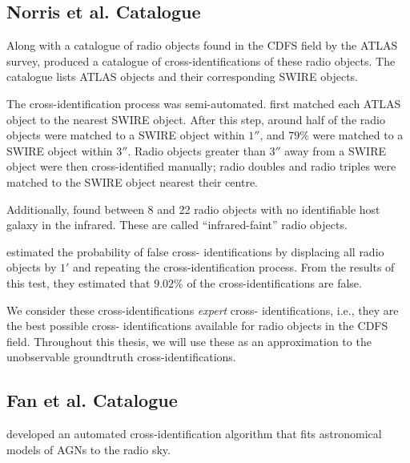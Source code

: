         \subsection{Norris et al. Catalogue}
        \label{sec:norris}

            Along with a catalogue of radio objects found in the CDFS field by
            the ATLAS survey, \citet{norris06} produced a catalogue of
            cross-identifications of these radio objects. The catalogue lists
            ATLAS objects and their corresponding SWIRE objects.

            The cross-identification process was semi-automated.
            \citeauthor{norris06} first matched each ATLAS object to the nearest
            SWIRE object. After this step, around half of the radio objects were
            matched to a SWIRE object within $1''$, and $79\%$ were matched to a
            SWIRE object within $3''$. Radio objects greater than $3''$ away
            from a SWIRE object were then cross-identified manually; radio
            doubles and radio triples were matched to the SWIRE object nearest
            their centre.

            Additionally, \citeauthor{norris06} found between 8 and 22 radio
            objects with no identifiable host galaxy in the infrared. These are
            called ``infrared-faint'' radio objects.

            \citeauthor{norris06} estimated the probability of false cross-
            identifications by displacing all radio objects by $1'$ and
            repeating the cross-identification process. From the results of this
            test, they estimated that $9.02\%$ of the cross-identifications are
            false.

            We consider these cross-identifications \emph{expert} cross-
            identifications, i.e., they are the best possible cross-
            identifications available for radio objects in the CDFS field.
            Throughout this thesis, we will use these as an approximation to the
            unobservable groundtruth cross-identifications.

        \subsection{Fan et al. Catalogue}
        \label{sec:fan}

            \citet{fan15} developed an automated cross-identification algorithm
            that fits astronomical models of AGNs to the radio sky.

